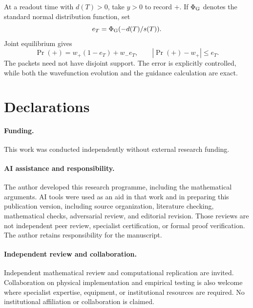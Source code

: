 \documentclass[11pt]{article}
\numberwithin{equation}{section}
\theoremstyle{definition}
\begin{document}
At a readout time with \(d(T)>0\), take \(y>0\) to record \(+\). If \(\Phi_{\rm G}\) denotes the standard normal distribution function, set
\[
 e_T=\Phi_{\rm G}(-d(T)/s(T)).
\]
Joint equilibrium gives
\[
 \Pr(+)=w_+(1-e_T)+w_-e_T,\qquad
 |\Pr(+)-w_+|\le e_T.
\]
The packets need not have disjoint support. The error is explicitly controlled, while both the wavefunction evolution and the guidance calculation are exact.

\section*{Declarations}
\paragraph{Funding.} This work was conducted independently without external research funding.

\paragraph{AI assistance and responsibility.} The author developed this research programme, including the mathematical arguments. AI tools were used as an aid in that work and in preparing this publication version, including source organization, literature checking, mathematical checks, adversarial review, and editorial revision. Those reviews are not independent peer review, specialist certification, or formal proof verification. The author retains responsibility for the manuscript.

\paragraph{Independent review and collaboration.} Independent mathematical review and computational replication are invited. Collaboration on physical implementation and empirical testing is also welcome where specialist expertise, equipment, or institutional resources are required. No institutional affiliation or collaboration is claimed.
\end{document}
